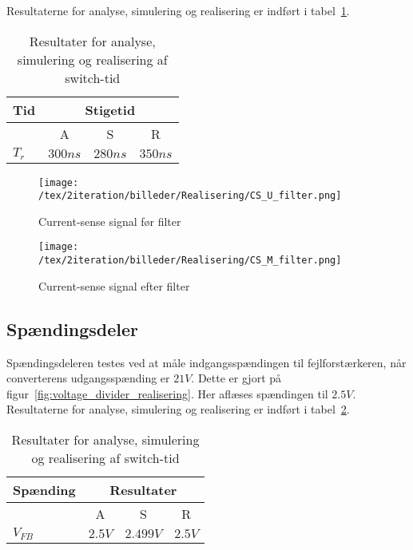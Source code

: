 \noindent Resultaterne for analyse, simulering og realisering er indført i tabel~\ref{tab:resultater_cs_filter_2}.


\begin{table}[H] 			
	\centering
	\begin{tabularx}{\textwidth}{|X|c|c|c|}
		\hline
		\textbf{Tid} & \multicolumn{3}{|c|}{\textbf{Stigetid}} 										\\ \hline
		& A & S & R 									\\ \hline
		$T_{r}$ & $300ns$ & $280ns$ & $350ns$ 									\\ \hline 
		
	\end{tabularx}
	\caption{Resultater for analyse, simulering og realisering af switch-tid}
	\label{tab:resultater_cs_filter_2}
\end{table}

\begin{figure}[H]
	\center
	\texttt{[image: /tex/2iteration/billeder/Realisering/CS\_U\_filter.png]}
	\caption{Current-sense signal før filter}
	\label{fig:CS_U_filter}
\end{figure}

\begin{figure}[H]
	\center
	\texttt{[image: /tex/2iteration/billeder/Realisering/CS\_M\_filter.png]}
	\caption{Current-sense signal efter filter}
	\label{fig:CS_M_filter}
\end{figure}


\subsection{Spændingsdeler}
\noindent Spændingsdeleren testes ved at måle indgangsspændingen til fejlforstærkeren, når converterens udgangsspænding er $21V$. Dette er gjort på figur~\ref{fig:voltage_divider_realisering}. Her aflæses spændingen til $2.5V$. Resultaterne for analyse, simulering og realisering er indført i tabel~\ref{tab:resultat_voltage_divider}.


\begin{table}[H] 			
	\centering
	\begin{tabularx}{\textwidth}{|X|c|c|c|}
		\hline
		\textbf{Spænding} & \multicolumn{3}{|c|}{\textbf{Resultater}} 		\\ \hline
		& A & S & R 									\\ \hline
		$V_{FB}$ & $2.5V$ & $2.499V$ & $2.5V$ 									\\ \hline 
		
	\end{tabularx}
	\caption{Resultater for analyse, simulering og realisering af switch-tid}
	\label{tab:resultat_voltage_divider}
\end{table}

